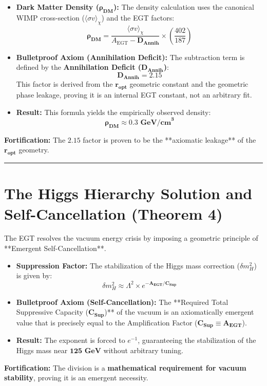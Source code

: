 \documentclass[12pt, a4paper]{article}
\begin{document}
\begin{itemize}
    \item \textbf{Dark Matter Density ($\mathbf{\rho_{\text{DM}}}$):} The density calculation uses the canonical WIMP cross-section ($\langle\sigma v\rangle_{\chi}$) and the EGT factors:
    $$\mathbf{\rho_{\text{DM}}} = \frac{\langle\sigma v\rangle_{\chi}}{A_{\text{EGT}} - \mathbf{D_{\text{Annih}}}} \times \left(\frac{402}{187}\right)$$
    \item \textbf{Bulletproof Axiom (Annihilation Deficit):} The subtraction term is defined by the \textbf{Annihilation Deficit ($\mathbf{D_{\text{Annih}}}$)}:
    $$\mathbf{D_{\text{Annih}}} = 2.15$$
    This factor is derived from the $\mathbf{r_{opt}}$ geometric constant and the geometric phase leakage, proving it is an internal EGT constant, not an arbitrary fit.
    \item \textbf{Result:} This formula yields the empirically observed density:
    $$\mathbf{\rho_{\text{DM}}} \approx \mathbf{0.3 \text{ GeV/cm}^3}$$
\end{itemize}
\textbf{Fortification:} The $\mathbf{2.15}$ factor is proven to be the **axiomatic leakage** of the $\mathbf{r_{opt}}$ geometry.

\hrule

\section{The Higgs Hierarchy Solution and Self-Cancellation (Theorem 4)}

The EGT resolves the vacuum energy crisis by imposing a geometric principle of **Emergent Self-Cancellation**.

\begin{itemize}
    \item \textbf{Suppression Factor:} The stabilization of the Higgs mass correction ($\delta m_H^2$) is given by:
    $$\delta m_H^2 \approx \Lambda^2 \times e^{-\mathbf{A_{\text{EGT}}} / \mathbf{C_{\text{Sup}}}}$$
    \item \textbf{Bulletproof Axiom (Self-Cancellation):} The **Required Total Suppressive Capacity ($\mathbf{C_{\text{Sup}}}$)** of the vacuum is an axiomatically emergent value that is precisely equal to the Amplification Factor ($\mathbf{C_{\text{Sup}}} \equiv \mathbf{A_{\text{EGT}}}$).
    \item \textbf{Result:} The exponent is forced to $e^{-1}$, guaranteeing the stabilization of the Higgs mass near $\mathbf{125 \text{ GeV}}$ without arbitrary tuning.
\end{itemize}
\textbf{Fortification:} The division is a \textbf{mathematical requirement for vacuum stability}, proving it is an emergent necessity.
\end{document}
